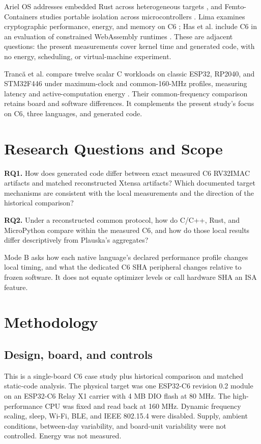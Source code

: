 \documentclass[10pt]{article}
\begin{document}
Ariel OS addresses embedded Rust across heterogeneous targets \citep{frank2025ariel}, and Femto-Containers studies portable isolation across microcontrollers \citep{zandberg2022femtocontainers}. Lima examines cryptographic performance, energy, and memory on C6 \citep{lima2025esp32c6signatures}; Has et al. include C6 in an evaluation of constrained WebAssembly runtimes \citep{has2025wasmiot}. These are adjacent questions: the present measurements cover kernel time and generated code, with no energy, scheduling, or virtual-machine experiment.

Trancă et al. compare twelve scalar C workloads on classic ESP32, RP2040, and STM32F446 under maximum-clock and common-160-MHz profiles, measuring latency and active-computation energy \citep{tranca2026workload}. Their common-frequency comparison retains board and software differences. It complements the present study's focus on C6, three languages, and generated code.

\section{Research Questions and Scope}
\textbf{RQ1.} How does generated code differ between exact measured C6 RV32IMAC artifacts and matched reconstructed Xtensa artifacts? Which documented target mechanisms are consistent with the local measurements and the direction of the historical comparison?

\textbf{RQ2.} Under a reconstructed common protocol, how do C/C++, Rust, and MicroPython compare within the measured C6, and how do those local results differ descriptively from Plauska's aggregates?

Mode B asks how each native language's declared performance profile changes local timing, and what the dedicated C6 SHA peripheral changes relative to frozen software. It does not equate optimizer levels or call hardware SHA an ISA feature.

\section{Methodology}
\subsection{Design, board, and controls}
This is a single-board C6 case study plus historical comparison and matched static-code analysis. The physical target was one ESP32-C6 revision 0.2 module on an ESP32-C6 Relay X1 carrier with 4 MB DIO flash at 80 MHz. The high-performance CPU was fixed and read back at 160 MHz. Dynamic frequency scaling, sleep, Wi-Fi, BLE, and IEEE 802.15.4 were disabled. Supply, ambient conditions, between-day variability, and board-unit variability were not controlled. Energy was not measured.
\end{document}
